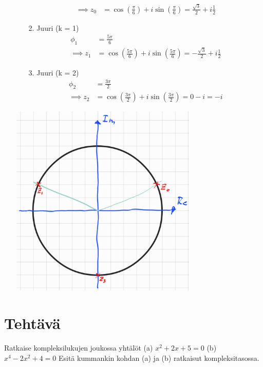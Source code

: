 \documentclass{article}
\newcounter{tehtava}
\begin{document}
\begin{itemize}
\begin{itemize}
\[\begin{aligned}
            \implies z_0 &= \cos\left( \frac{\pi}{6} \right) + i \sin\left( \frac{\pi}{6} \right) = \frac{\sqrt{3}}{2} + i \frac{1}{2}
        \end{aligned}
        \]
        \item [2.] Juuri (k = 1)
        \[
        \begin{aligned}
            \phi_1 &= \frac{5\pi}{6}\\
            \implies z_1 &= \cos\left( \frac{5\pi}{6} \right) + i \sin\left( \frac{5\pi}{6} \right) = -\frac{\sqrt{3}}{2} + i \frac{1}{2}
        \end{aligned}
        \]
        \item [3.] Juuri (k = 2)
        \[
        \begin{aligned}
            \phi_2 &= \frac{3\pi}{2}\\
            \implies z_2 &= \cos\left( \frac{3\pi}{2} \right) + i \sin\left( \frac{3\pi}{2} \right) = 0 - i = -i            
        \end{aligned}
        \]
    \end{itemize}
    \begin{center}
        \includegraphics[width=0.7\textwidth]{harj6teht5b.jpg}
    \end{center}
\end{itemize}

\newpage
{}
\section*{Tehtävä \thetehtava}
Ratkaise kompleksilukujen joukossa yhtälöt\newline
(a) $x^2 + 2x + 5 = 0$\newline
(b) $x^4 - 2x^2 + 4 = 0$\newline
Esitä kummankin kohdan (a) ja (b) ratkaisut kompleksitasossa.
\end{document}
